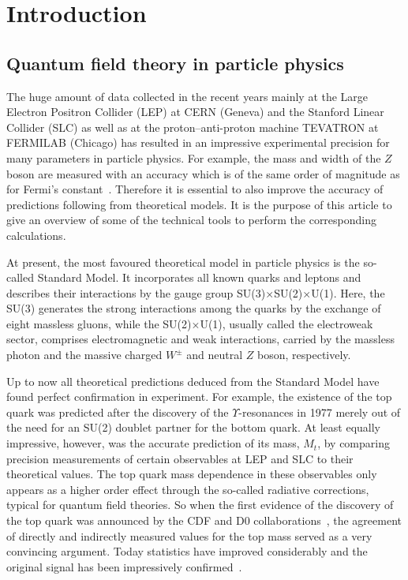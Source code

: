 %
\section{Introduction}
\subsection{Quantum field theory in particle physics}
%
The huge amount of data collected in the recent years mainly at the
Large Electron Positron Collider (LEP) at CERN (Geneva) and the
Stanford Linear Collider (SLC)
as well as at the proton--anti-proton machine TEVATRON 
at FERMILAB (Chicago) has
resulted in an impressive experimental precision for many parameters in
particle physics. For example, the mass and width of the $Z$ boson are
measured with an accuracy which is of the same order of magnitude as
for Fermi's constant~\cite{Kar98,Hol98}.
Therefore it is essential to also improve the
accuracy of predictions following from theoretical models. It is the
purpose of this article to give an overview of some of the technical
tools to perform the corresponding calculations.

At present, the most favoured theoretical model in particle physics is
the so-called Standard Model. It incorporates all known quarks and
leptons and describes their interactions by the gauge group
SU(3)$\times$SU(2)$\times$U(1). Here, the SU(3) generates the strong
interactions among the quarks by the exchange of eight massless gluons,
while the SU(2)$\times$U(1), usually called the electroweak sector,
comprises electromagnetic and weak interactions, carried by the
massless photon and the massive charged $W^\pm$ and neutral $Z$ boson,
respectively.

Up to now all theoretical predictions deduced from the Standard Model
have found perfect confirmation in experiment. For example, the
existence of the top quark was predicted after the discovery
of the $\Upsilon$-resonances in 1977 \cite{Herb77} merely out of the
need for an SU(2) doublet partner for the bottom quark. At least equally
impressive, however, was the accurate prediction of its mass, $M_t$, by
comparing precision measurements of certain observables at LEP and SLC
to their theoretical values. The top quark mass dependence in these
observables only appears as a higher order effect through the so-called
radiative corrections, typical for quantum field theories. So when the
first evidence of the discovery of the top quark was announced by the
CDF and D0 collaborations~\cite{TOP95}, the agreement of directly and
indirectly measured values for the top mass served as a very convincing
argument.  Today statistics have improved considerably and the original
signal has been impressively confirmed~\cite{CDFD098}.

